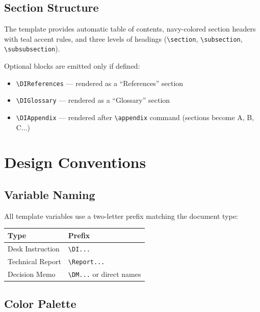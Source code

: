 {\subsection{Section Structure}

The template provides automatic table of contents, navy-colored section headers with teal accent rules, and three levels of headings (\texttt{\textbackslash{}section}, \texttt{\textbackslash{}subsection}, \texttt{\textbackslash{}subsubsection}).

Optional blocks are emitted only if defined:
\begin{itemize}
\item \texttt{\textbackslash{}DIReferences} --- rendered as a ``References'' section
\item \texttt{\textbackslash{}DIGlossary} --- rendered as a ``Glossary'' section
\item \texttt{\textbackslash{}DIAppendix} --- rendered after \texttt{\textbackslash{}appendix} command (sections become A, B, C...)
\end{itemize}

\section{Design Conventions}

\subsection{Variable Naming}

All template variables use a two-letter prefix matching the document type:

\begin{center}
\begin{tabular}{@{}l l@{}}
\toprule
\textbf{Type} & \textbf{Prefix} \\
\midrule
Desk Instruction & \texttt{\textbackslash{}DI...} \\
Technical Report & \texttt{\textbackslash{}Report...} \\
Decision Memo    & \texttt{\textbackslash{}DM...} or direct names \\
\bottomrule
\end{tabular}
\end{center}

\subsection{Color Palette}

}
